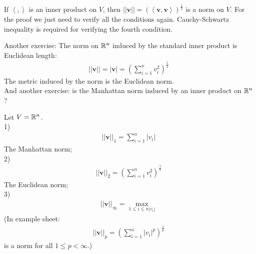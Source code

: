 \documentclass[a4paper]{article}
\begin{document}
\begin{coro}
If $\left<,\right>$ is an inner product on $V$, then $||\mathbf{v}|| = \left(\left<\mathbf{v},\mathbf{v}\right>\right)^{\frac{1}{2}}$ is a norm on $V$.
For the proof we just need to verify all the conditions again. Cauchy-Schwartz inequality is required for verifying the fourth condition.
\end{coro}

Another exercise: The norm on $\mathbb{R}^n$ induced by the standard inner product is Euclidean length:
\begin{equation*}
\begin{aligned}
||\mathbf{v}|| = |\mathbf{v}| = \left(\sum_{i=1}^n v_i^2\right)^\frac{1}{2}
\end{aligned}
\end{equation*}
The metric induced by the norm is the Euclidean norm.\\
And another exercise: is the Manhattan norm induced by an inner product on $\mathbb{R}^n$?

\begin{eg}
Let $V=\mathbb{R}^n$.\\
1) 
\begin{equation*}
\begin{aligned}
||\mathbf{v}||_1=\sum_{i=1}^n |v_i|
\end{aligned}
\end{equation*}
The Manhattan norm;\\
2)
\begin{equation*}
\begin{aligned}
||\mathbf{v}||_2 = \left(\sum_{i=1}^n v_i^2\right)^\frac{1}{2}
\end{aligned}
\end{equation*}
The Euclidean norm;\\
3)
\begin{equation*}
\begin{aligned}
||\mathbf{v}||_\infty = \max_{1\leq i \leq n |v_i|}
\end{aligned}
\end{equation*}
(In example sheet:
\begin{equation*}
\begin{aligned}
||\mathbf{v}||_p = \left(\sum_{i=1}^n |v_i|^p \right)^\frac{1}{p}
\end{aligned}
\end{equation*}
is a norm for all $1\leq p < \infty$.)
\end{eg}
\end{document}
